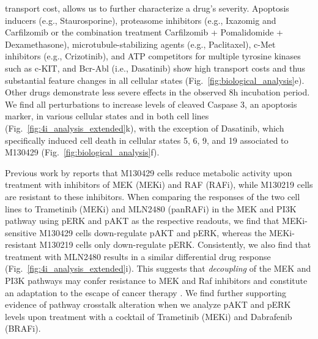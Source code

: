 transport cost, allows us to further characterize a drug's severity. 
Apoptosis inducers (e.g., Staurosporine), proteasome inhibitors (e.g., Ixazomig and Carfilzomib or the combination treatment Carfilzomib + Pomalidomide + Dexamethasone), microtubule-stabilizing agents (e.g., Paclitaxel), c-Met inhibitors (e.g., Crizotinib), and ATP competitors for multiple tyrosine kinases such as c-KIT, and Bcr-Abl (i.e., Dasatinib) show high transport costs and thus substantial feature changes in all cellular states (Fig.~\ref{fig:biological_analysis}e). Other drugs demonstrate less severe effects in the observed 8h incubation period. 
We find all perturbations to increase levels of cleaved Caspase 3, an apoptosis marker, in various cellular states and in both cell lines (Fig.~\ref{fig:4i_analysis_extended}k), with the exception of Dasatinib, which specifically induced cell death in cellular states 5, 6, 9, and 19 associated to M130429 (Fig.~\ref{fig:biological_analysis}f).


 Previous work by \citet{smith2016inhibiting} reports that M130429 cells reduce metabolic activity %
upon treatment with inhibitors of MEK (MEKi) and RAF (RAFi), while M130219 cells are resistant to these inhibitors. When comparing the responses of the two cell lines to Trametinib (MEKi) and MLN2480 (panRAFi) in the MEK and PI3K pathway using pERK and pAKT as the respective readouts, we find that MEKi-sensitive M130429 cells down-regulate pAKT and pERK, whereas the MEKi-resistant M130219 cells only down-regulate pERK. Consistently, we also find that treatment with MLN2480 results in a similar differential drug response (Fig.~\ref{fig:4i_analysis_extended}i). This suggests that \textit{decoupling} of the MEK and PI3K pathways may confer resistance to MEK and Raf inhibitors and constitute an adaptation to the escape of cancer therapy \citep{kun2021mek}. We find further supporting evidence of pathway crosstalk alteration when we analyze pAKT and pERK levels upon treatment with a cocktail of Trametinib (MEKi) and Dabrafenib (BRAFi). 


